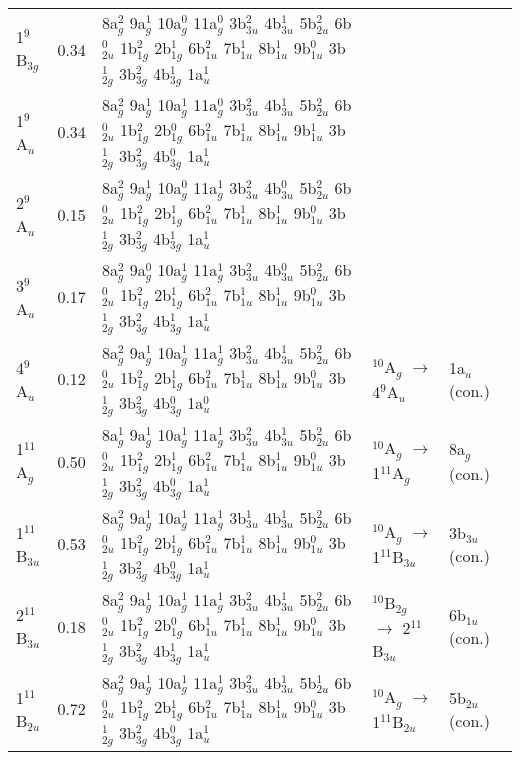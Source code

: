 \begin{refsection}
\begin{center}
\begin{landscape}
\begin{longtable}{@{\extracolsep{\fill}}lllll}
	1$^9$B$_{3g}$    & 0.34 & 8a$_g^2$ 9a$_g^1$ 10a$_g^0$ 11a$_g^0$ 3b$_{3u}^2$ 4b$_{3u}^1$ 5b$_{2u}^2$ 6b$_{2u}^0$ 1b$_{1g}^2$ 2b$_{1g}^1$ 6b$_{1u}^2$ 7b$_{1u}^1$ 8b$_{1u}^1$ 9b$_{1u}^0$ 3b$_{2g}^1$ 3b$_{3g}^2$ 4b$_{3g}^1$ 1a$_u^1$ &                &             \\
	1$^9$A$_{u}$    & 0.34 & 8a$_g^2$ 9a$_g^1$ 10a$_g^1$ 11a$_g^0$ 3b$_{3u}^2$ 4b$_{3u}^1$ 5b$_{2u}^2$ 6b$_{2u}^0$ 1b$_{1g}^2$ 2b$_{1g}^0$ 6b$_{1u}^2$ 7b$_{1u}^1$ 8b$_{1u}^1$ 9b$_{1u}^1$ 3b$_{2g}^1$ 3b$_{3g}^2$ 4b$_{3g}^0$ 1a$_u^1$ &                &             \\
	2$^9$A$_{u}$    & 0.15 & 8a$_g^2$ 9a$_g^1$ 10a$_g^0$ 11a$_g^1$ 3b$_{3u}^2$ 4b$_{3u}^0$ 5b$_{2u}^2$ 6b$_{2u}^0$ 1b$_{1g}^2$ 2b$_{1g}^1$ 6b$_{1u}^2$ 7b$_{1u}^1$ 8b$_{1u}^1$ 9b$_{1u}^0$ 3b$_{2g}^1$ 3b$_{3g}^2$ 4b$_{3g}^1$ 1a$_u^1$ &                &             \\
	3$^9$A$_{u}$    & 0.17 & 8a$_g^2$ 9a$_g^0$ 10a$_g^1$ 11a$_g^1$ 3b$_{3u}^2$ 4b$_{3u}^0$ 5b$_{2u}^2$ 6b$_{2u}^0$ 1b$_{1g}^2$ 2b$_{1g}^1$ 6b$_{1u}^2$ 7b$_{1u}^1$ 8b$_{1u}^1$ 9b$_{1u}^0$ 3b$_{2g}^1$ 3b$_{3g}^2$ 4b$_{3g}^1$ 1a$_u^1$ &                &             \\
	4$^9$A$_{u}$    & 0.12 & 8a$_g^2$ 9a$_g^1$ 10a$_g^1$ 11a$_g^1$ 3b$_{3u}^2$ 4b$_{3u}^1$ 5b$_{2u}^2$ 6b$_{2u}^0$ 1b$_{1g}^2$ 2b$_{1g}^1$ 6b$_{1u}^2$ 7b$_{1u}^1$ 8b$_{1u}^1$ 9b$_{1u}^0$ 3b$_{2g}^1$ 3b$_{3g}^2$ 4b$_{3g}^0$ 1a$_u^0$ & $^{10}$A$_g$     $\longrightarrow$ 4$^9$A$_{u}$    & 1a$_u$ (con.)  \\
	1$^{11}$A$_g$    & 0.50 & 8a$_g^1$ 9a$_g^1$ 10a$_g^1$ 11a$_g^1$ 3b$_{3u}^2$ 4b$_{3u}^1$ 5b$_{2u}^2$ 6b$_{2u}^0$ 1b$_{1g}^2$ 2b$_{1g}^1$ 6b$_{1u}^2$ 7b$_{1u}^1$ 8b$_{1u}^1$ 9b$_{1u}^0$ 3b$_{2g}^1$ 3b$_{3g}^2$ 4b$_{3g}^0$ 1a$_u^1$ & $^{10}$A$_g$     $\longrightarrow$  1$^{11}$A$_g$    & 8a$_g$ (con.)  \\
	1$^{11}$B$_{3u}$ & 0.53 & 8a$_g^2$ 9a$_g^1$ 10a$_g^1$ 11a$_g^1$ 3b$_{3u}^1$ 4b$_{3u}^1$ 5b$_{2u}^2$ 6b$_{2u}^0$ 1b$_{1g}^2$ 2b$_{1g}^1$ 6b$_{1u}^2$ 7b$_{1u}^1$ 8b$_{1u}^1$ 9b$_{1u}^0$ 3b$_{2g}^1$ 3b$_{3g}^2$ 4b$_{3g}^0$ 1a$_u^1$ & $^{10}$A$_g$     $\longrightarrow$ 1$^{11}$B$_{3u}$ & 3b$_{3u}$ (con.) \\
	2$^{11}$B$_{3u}$ & 0.18 & 8a$_g^2$ 9a$_g^1$ 10a$_g^1$ 11a$_g^1$ 3b$_{3u}^2$ 4b$_{3u}^1$ 5b$_{2u}^2$ 6b$_{2u}^0$ 1b$_{1g}^2$ 2b$_{1g}^0$ 6b$_{1u}^1$ 7b$_{1u}^1$ 8b$_{1u}^1$ 9b$_{1u}^0$ 3b$_{2g}^1$ 3b$_{3g}^2$ 4b$_{3g}^1$ 1a$_u^1$ & $^{10}$B$_{2g}$  $\longrightarrow$ 2$^{11}$B$_{3u}$ & 6b$_{1u}$ (con.) \\
	1$^{11}$B$_{2u}$ & 0.72 & 8a$_g^2$ 9a$_g^1$ 10a$_g^1$ 11a$_g^1$ 3b$_{3u}^2$ 4b$_{3u}^1$ 5b$_{2u}^1$ 6b$_{2u}^0$ 1b$_{1g}^2$ 2b$_{1g}^1$ 6b$_{1u}^2$ 7b$_{1u}^1$ 8b$_{1u}^1$ 9b$_{1u}^0$ 3b$_{2g}^1$ 3b$_{3g}^2$ 4b$_{3g}^0$ 1a$_u^1$ & $^{10}$A$_g$     $\longrightarrow$ 1$^{11}$B$_{2u}$ & 5b$_{2u}$ (con.) \\

\end{longtable}
\end{landscape}
\end{center}
\end{refsection}
